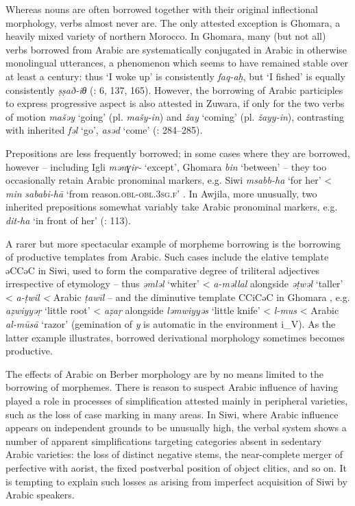 \documentclass[output=paper]{langsci/langscibook}
\begin{document}
Whereas nouns are often borrowed together with their original inflectional morphology, verbs almost never are. The only attested exception is Ghomara, a heavily mixed variety of northern Morocco.  In Ghomara, many (but not all) verbs borrowed from Arabic are systematically conjugated in Arabic in otherwise monolingual utterances, a phenomenon which seems to have remained stable over at least a century: thus `I woke up' is consistently \textit{faq-aḫ}, but `I fished' is equally consistently \textit{ṣṣað-iθ} (\citealt{Mourigh2016}: 6, 137, 165). However, the borrowing of Arabic participles to express progressive aspect is also attested in Zuwara, if only for the two verbs of motion \textit{mašəy} `going' (pl. \textit{mašy-in}) and \textit{žay} `coming' (pl. \textit{žayy-in}), contrasting with inherited \textit{fəl} `go', \textit{asəd} `come' (\citealt{Kossmann2013book}: 284–285).

Prepositions are less frequently borrowed; in some cases where they are borrowed, however – including Igli \textit{mənɣir-} `except', Ghomara \textit{bin} `between' \citep[293]{Kossmann2013book} – they too occasionally retain Arabic pronominal markers, e.g. Siwi \textit{msabb-ha} `for her' < \textit{min} \textit{sababi-hā}  `from reason.\textsc{obl}{}-\textsc{obl.3sg.f}' \citep[48]{Souag2013book}.  In Awjila, more unusually, two inherited prepositions somewhat variably take Arabic pronominal markers, e.g. \textit{dit-ha} `in front of her' (\citealt{vanPutten2014}: 113).

A rarer but more spectacular example of morpheme borrowing is the borrowing of productive templates from Arabic. Such cases include the elative template əCCəC in Siwi, used to form the comparative degree of triliteral adjectives irrespective of etymology – thus \textit{əmləl} `whiter' < \textit{a-məllal} alongside \textit{əṭwəl} `taller' < \textit{a-ṭwil} \textit{<} Arabic \textit{ṭawīl} \citep{Souag2009} – and the diminutive template CCiCəC in Ghomara \citep{Mourigh2016}, e.g. \textit{aẓwiyyəṛ} `little root' < \textit{aẓaṛ} alongside \textit{ləmwiyyəs} `little knife' < \textit{l-mus} < Arabic \textit{al-mūsā} `razor' (gemination of \textit{y} is automatic in the environment i\_V). As the latter example illustrates, borrowed derivational morphology sometimes becomes productive.

The effects of Arabic on Berber morphology are by no means limited to the borrowing of morphemes. There is reason to suspect Arabic influence of having played a role in processes of simplification attested mainly in peripheral varieties, such as the loss of case marking in many areas. In Siwi, where Arabic influence appears on independent grounds to be unusually high, the verbal system shows a number of apparent simplifications targeting categories absent in sedentary Arabic varieties: the loss of distinct negative stems, the near-complete merger of perfective with aorist, the fixed postverbal position of object clitics, and so on. It is tempting to explain such losses as arising from imperfect acquisition of Siwi by Arabic speakers.
\end{document}
